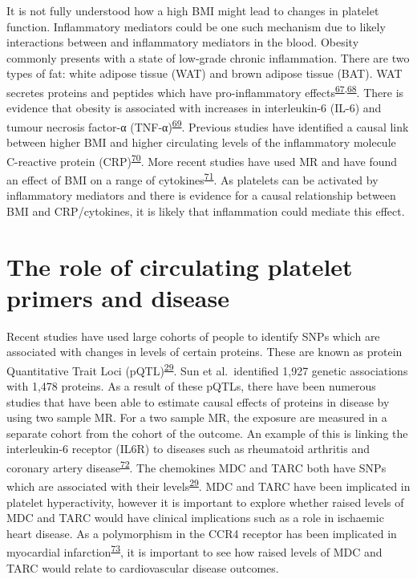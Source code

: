 \documentclass[11pt,twoside]{bristolthesis}
\begin{document}
It is not fully understood how a high BMI might lead to changes in platelet function. Inflammatory mediators could be one such mechanism due to likely interactions between and inflammatory mediators in the blood. Obesity commonly presents with a state of low-grade chronic inflammation. There are two types of fat: white adipose tissue (WAT) and brown adipose tissue (BAT). WAT secretes proteins and peptides which have pro-inflammatory effects\textsuperscript{\protect\hyperlink{ref-Cercato2019}{67},\protect\hyperlink{ref-Kern2001}{68}}. There is evidence that obesity is associated with increases in interleukin-6 (IL-6) and tumour necrosis factor-α (TNF-α)\textsuperscript{\protect\hyperlink{ref-Esser2014}{69}}. Previous studies have identified a causal link between higher BMI and higher circulating levels of the inflammatory molecule C-reactive protein (CRP)\textsuperscript{\protect\hyperlink{ref-Timpson2011}{70}}. More recent studies have used MR and have found an effect of BMI on a range of cytokines\textsuperscript{\protect\hyperlink{ref-Kalaoja2021}{71}}. As platelets can be activated by inflammatory mediators and there is evidence for a causal relationship between BMI and CRP/cytokines, it is likely that inflammation could mediate this effect.

\hypertarget{the-role-of-circulating-platelet-primers-and-disease}{%
\section{The role of circulating platelet primers and disease}\label{the-role-of-circulating-platelet-primers-and-disease}}

Recent studies have used large cohorts of people to identify SNPs which are associated with changes in levels of certain proteins. These are known as protein Quantitative Trait Loci (pQTL)\textsuperscript{\protect\hyperlink{ref-Sun2018}{29}}. Sun et al.~identified 1,927 genetic associations with 1,478 proteins. As a result of these pQTLs, there have been numerous studies that have been able to estimate causal effects of proteins in disease by using two sample MR. For a two sample MR, the exposure are measured in a separate cohort from the cohort of the outcome. An example of this is linking the interleukin-6 receptor (IL6R) to diseases such as rheumatoid arthritis and coronary artery disease\textsuperscript{\protect\hyperlink{ref-Bretherick2020}{72}}. The chemokines MDC and TARC both have SNPs which are associated with their levels\textsuperscript{\protect\hyperlink{ref-Sun2018}{29}}. MDC and TARC have been implicated in platelet hyperactivity, however it is important to explore whether raised levels of MDC and TARC would have clinical implications such as a role in ischaemic heart disease. As a polymorphism in the CCR4 receptor has been implicated in myocardial infarction\textsuperscript{\protect\hyperlink{ref-Noori2018}{73}}, it is important to see how raised levels of MDC and TARC would relate to cardiovascular disease outcomes.
\end{document}
